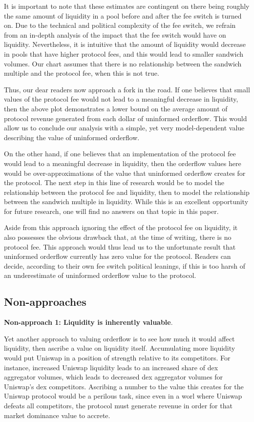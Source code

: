     It is important to note that these estimates are contingent on there being roughly the same amount of liquidity in a pool before and after the fee switch is turned on. Due to the technical and political complexity of the fee switch, we refrain from an in-depth analysis of the impact that the fee switch would have on liquidity. Nevertheless, it is intuitive that the amount of liquidity would decrease in pools that have higher protocol fees, and this would lead to smaller sandwich volumes. Our chart assumes that there is no relationship between the sandwich multiple and the protocol fee, when this is not true. 

    Thus, our dear readers now approach a fork in the road. If one believes that small values of the protocol fee would not lead to a meaningful decrease in liquidity, then the above plot demonstrates a lower bound on the average amount of protocol revenue generated from each dollar of uninformed orderflow. This would allow us to conclude our analysis with a simple, yet very model-dependent value describing the value of uninformed orderflow.

    On the other hand, if one believes that an implementation of the protocol fee would lead to a meaningful decrease in liquidity, then the orderflow values here would be over-approximations of the value that uninformed orderflow creates for the protocol. The next step in this line of research would be to model the relationship between the protocol fee and liquidity, then to model the relationship between the sandwich multiple in liquidity. While this is an excellent opportunity for future research, one will find no answers on that topic in this paper.

    Aside from this approach ignoring the effect of the protocol fee on liquidity, it also possesses the obvious drawback that, at the time of writing, there is no protocol fee. This approach would thus lead us to the unfortunate result that uninformed orderflow currently has zero value for the protocol. Readers can decide, according to their own fee switch political leanings, if this is too harsh of an underestimate of uninformed orderflow value to the protocol.

\subsection{Non-approaches}
    \textbf{Non-approach 1: Liquidity is inherently valuable}.

    Yet another approach to valuing orderflow is to see how much it would affect liquidity, then ascribe a value on liquidity itself. Accumulating more liquidity would put Uniswap in a position of strength relative to its competitors. For instance, increased Uniswap liquidity leads to an increased share of dex aggregator volumes, which leads to decreased dex aggregator volumes for Uniswap's dex competitors. Ascribing a number to the value this creates for the Uniswap protocol would be a perilous task, since even in a worl where Uniswap defeats all competitors, the protocol must generate revenue in order for that market dominance value to accrete.



